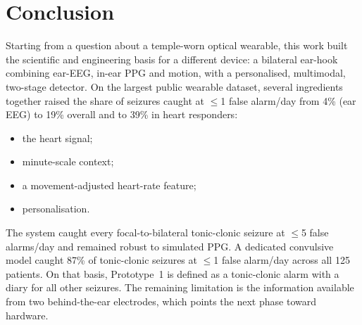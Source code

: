 \section{Conclusion}
\label{sec:conclusion}

Starting from a question about a temple-worn optical wearable, this work built the scientific and engineering basis for a different device: a bilateral ear-hook combining ear-EEG, in-ear PPG and motion, with a personalised, multimodal, two-stage detector. On the largest public wearable dataset, several ingredients together raised the share of seizures caught at $\le$1 false alarm/day from 4\% (ear EEG) to 19\% overall and to 39\% in heart responders:
\begin{itemize}
\item the heart signal;
\item minute-scale context;
\item a movement-adjusted heart-rate feature;
\item personalisation.
\end{itemize}
The system caught every focal-to-bilateral tonic-clonic seizure at $\le$5 false alarms/day and remained robust to simulated PPG. A dedicated convulsive model caught 87\% of tonic-clonic seizures at $\le$1 false alarm/day across all 125 patients. On that basis, Prototype~1 is defined as a tonic-clonic alarm with a diary for all other seizures. The remaining limitation is the information available from two behind-the-ear electrodes, which points the next phase toward hardware.
